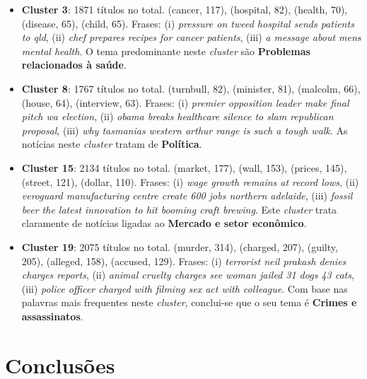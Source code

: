 \documentclass[10pt,twocolumn,letterpaper]{article}
\begin{document}
\begin{itemize}
  \item \textbf {Cluster 3}: 1871 títulos no total. (cancer, 117), (hospital, 82), (health, 70), (disease, 65), (child, 65). Frases: (i) \textit{pressure on tweed hospital sends patients to qld}, (ii) \textit{chef prepares recipes for cancer patients}, (iii) \textit{a message about mens mental health}. O tema predominante neste \textit{cluster} são \textbf{Problemas relacionados à saúde}.

  \item \textbf {Cluster 8}: 1767 títulos no total. (turnbull, 82), (minister, 81), (malcolm, 66), (house, 64), (interview, 63). Frases: (i) \textit{premier opposition leader make final pitch wa election}, (ii) \textit{obama breaks healthcare silence to slam republican proposal}, (iii) \textit{why tasmanias western arthur range is such a tough walk}. As notícias neste \textit{cluster} tratam de \textbf{Política}.

  \item \textbf {Cluster 15}: 2134 títulos no total. (market, 177), (wall, 153), (prices, 145), (street, 121), (dollar, 110). Frases: (i) \textit{wage growth remains at record lows}, (ii) \textit{veroguard manufacturing centre create 600 jobs northern adelaide}, (iii) \textit{fossil beer the latest innovation to hit booming craft brewing}. Este \textit{cluster} trata claramente de notícias ligadas ao \textbf{Mercado e setor econômico}.

  \item \textbf {Cluster 19}: 2075 títulos no total. (murder, 314), (charged, 207), (guilty, 205), (alleged, 158), (accused, 129). Frases: (i) \textit{terrorist neil prakash denies charges reports}, (ii) \textit{animal cruelty charges see woman jailed 31 dogs 43 cats}, (iii) \textit{police officer charged with filming sex act with colleague}. Com base nas palavras mais frequentes neste \textit{cluster}, conclui-se que o seu tema é \textbf{Crimes e assassinatos}.

\end{itemize}

\section{Conclusões}
\end{document}
